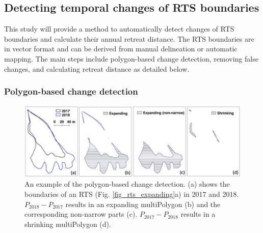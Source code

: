 \documentclass[authoryear,preprint,review,12pt]{elsarticle}
\begin{document}
\subsection{Detecting temporal changes of RTS boundaries}
\label{sec_detect_rts_changes}

This study will provide a method to automatically detect changes of RTS boundaries and calculate their annual retreat distance.
The RTS boundaries are in vector format and can be derived from manual delineation or automatic mapping. 
The main steps include polygon-based change detection, removing false changes, and calculating retreat distance as detailed below. 

\subsubsection{Polygon-based change detection}
\label{sec_polygon_change_det}

\begin{figure} 
	\centering
	\includegraphics[width=14cm]{figs/rts_polygon_change_det_trim.jpg}
	\caption{An example of the polygon-based change detection. (a) shows the boundaries of an RTS (Fig. \ref{fig_rts_expanding}a) in 2017 and 2018. $P_{2018}-P_{2017}$ results in an expanding multiPolygon (b) and the corresponding non-narrow parts (c). $P_{2017}-P_{2018}$ results in a shrinking multiPolygon (d).}
	\label{fig_rts_change_det}
\end{figure}
\end{document}
